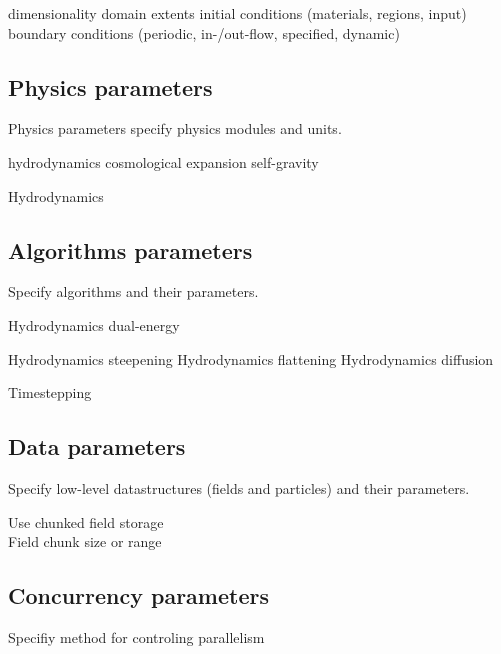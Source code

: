 \documentclass{article}
\begin{document}
  dimensionality
  domain extents
  initial conditions (materials, regions, input)
 boundary conditions (periodic, in-/out-flow, specified, dynamic)

\subsection{Physics parameters}

Physics parameters specify physics modules and units.

 hydrodynamics
  cosmological expansion
 self-gravity

Hydrodynamics


\subsection{Algorithms parameters} 

Specify algorithms and their parameters.

Hydrodynamics dual-energy

Hydrodynamics steepening
Hydrodynamics flattening
Hydrodynamics diffusion

Timestepping

\subsection{Data parameters}

Specify low-level datastructures (fields and particles) and their
parameters.

Use chunked field storage \\
Field chunk size or range

\subsection{Concurrency parameters} 

Specifiy method for controling parallelism
\end{document}

